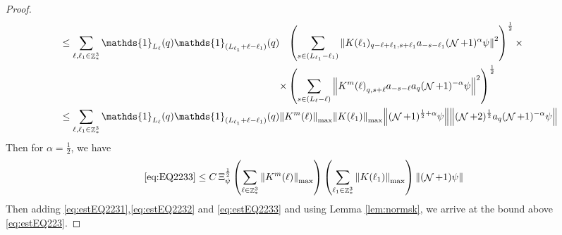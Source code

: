 \documentclass[sn-mathphys, Numbered ,a4paper]{sn-jnl}%
\DeclareMathOperator{\Z}{\mathbb{Z}}
\DeclareMathOperator{\NN}{\mathcal{N}}
\newcommand{\half}{\frac{1}{2}}
\theoremstyle{plain}
\theoremstyle{definition}
\theoremstyle{remark}
\theoremstyle{plain}
\theoremstyle{definition}
\theoremstyle{remark}
\begin{document}
{\begin{proof}
\begin{align}
			&\leq \sum\limits_{\ell, \ell_1\in \Z^3_*} \mathds{1}_{L_{\ell}}(q) \mathds{1}_{(L_{\ell_1}+\ell-\ell_1)}(q) \begin{aligned}[t]&\left(\sum\limits_{ s \in  (L_{\ell_1}-\ell_1)} \norm{K(\ell_1)_{q-\ell+\ell_1,s+\ell_1} a_{-s-\ell_1} (\NN+1)^{\alpha}\psi}^2\right)^\half \times \nonumber\\ \times &\left( \sum\limits_{ s \in (L_{\ell}-\ell) } \norm{ K^m{(\ell)}_{q,s+\ell}  a_{-s-\ell} a_{q} (\NN+1)^{-\alpha} \psi }^2\right)^\half \end{aligned}\nonumber\\
			&\leq \sum\limits_{\ell, \ell_1\in \Z^3_*} \mathds{1}_{L_{\ell}}(q) \mathds{1}_{(L_{\ell_1}+\ell-\ell_1)}(q) \norm{K^m{(\ell)}}_{\mathrm{max}} \norm{K(\ell_1)}_{\mathrm{max}} \norm{ (\NN+1)^{\half+\alpha}\psi} \norm{  (\NN+2)^\half  a_{q} (\NN+1)^{-\alpha} \psi } \nonumber
		\end{align} 
		Then for $\alpha = \half$, we have
		\begin{align}
			\eqref{eq:EQ2233}&\leq C\, \Xi_{\psi}^\half \left(\sum\limits_{\ell\in \Z^3_*} \norm{K^m(\ell)}_{\mathrm{max}}\right)\left(  \sum\limits_{ \ell_1\in \Z^3_*}  \norm{ K(\ell_1)}_{\mathrm{max}} \right) \norm{ (\NN+1) \psi}\label{eq:estEQ2233} 
		\end{align}
		Then adding \eqref{eq:estEQ2231},\eqref{eq:estEQ2232} and \eqref{eq:estEQ2233} and using Lemma \ref{lem:normsk}, we arrive at the bound above \eqref{eq:estEQ223}. 
\end{proof}}
\end{document}
